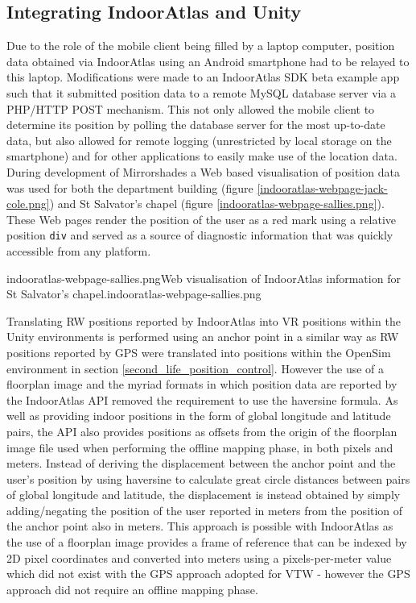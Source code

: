 
\subsection{Integrating IndoorAtlas and Unity}

Due to the role of the mobile client being filled by a laptop computer, position data obtained via IndoorAtlas using an Android smartphone had to be relayed to this laptop. Modifications were made to an IndoorAtlas SDK beta example app such that it submitted position data to a remote MySQL database server via a PHP/HTTP POST mechanism. This not only allowed the mobile client to determine its position by polling the database server for the most up-to-date data, but also allowed for remote logging (unrestricted by local storage on the smartphone) and for other applications to easily make use of the location data. During development of Mirrorshades a Web based visualisation of position data was used for both the department building (figure \ref{indooratlas-webpage-jack-cole.png}) and St Salvator's chapel (figure \ref{indooratlas-webpage-sallies.png}). These Web pages render the position of the user as a red mark using a relative position \texttt{div} and served as a source of diagnostic information that was quickly accessible from any platform.

        {indooratlas-webpage-sallies.png}{Web visualisation of IndoorAtlas information for St Salvator's chapel.}{indooratlas-webpage-sallies.png}

Translating RW positions reported by IndoorAtlas into VR positions within the Unity environments is performed using an anchor point in a similar way as RW positions reported by GPS were translated into positions within the OpenSim environment in section \ref{second_life_position_control}. However the use of a floorplan image and the myriad formats in which position data are reported by the IndoorAtlas API removed the requirement to use the haversine formula. As well as providing indoor positions in the form of global longitude and latitude pairs, the API also provides positions as offsets from the origin of the floorplan image file used when performing the offline mapping phase, in both pixels and meters. Instead of deriving the displacement between the anchor point and the user's position by using haversine to calculate great circle distances between pairs of global longitude and latitude, the displacement is instead obtained by simply adding/negating the position of the user reported in meters from the position of the anchor point also in meters. This approach is possible with IndoorAtlas as the use of a floorplan image provides a frame of reference that can be indexed by 2D pixel coordinates and converted into meters using a pixels-per-meter value which did not exist with the GPS approach adopted for VTW - however the GPS approach did not require an offline mapping phase.

